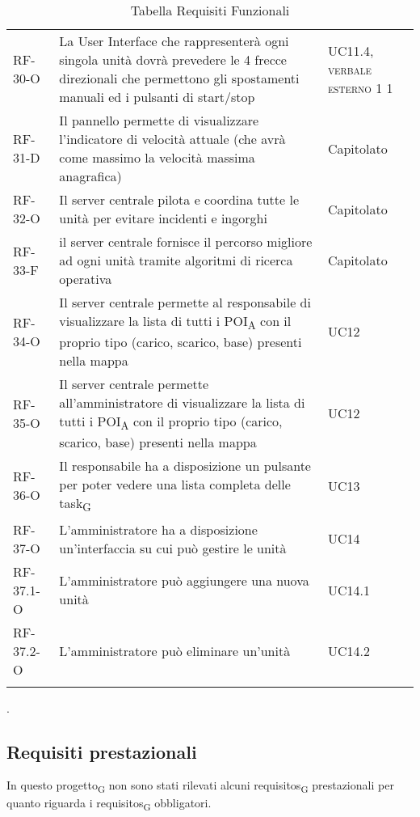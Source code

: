 \begin{longtable}{ 
		>{}p{} 
		>{}p{}
		>{\centering}p{} }
RF-30-O		&	La User Interface che rappresenterà ogni singola unità dovrà prevedere le 4 frecce direzionali che permettono gli spostamenti manuali ed i pulsanti di start/stop	&	UC11.4, \textsc{\textsc{verbale esterno 1} 1}\tabularnewline
RF-31-D		&	Il pannello permette di visualizzare l'indicatore di velocità attuale (che avrà come massimo la velocità massima anagrafica)	&	Capitolato\tabularnewline				
RF-32-O		&	Il server centrale pilota e coordina tutte le unità per evitare incidenti e ingorghi	&	Capitolato\tabularnewline
RF-33-F		&	il server centrale fornisce il percorso migliore ad ogni unità tramite algoritmi di ricerca operativa	&	Capitolato\tabularnewline				
RF-34-O		&	Il server centrale permette al responsabile di visualizzare la lista di tutti i \acrshort{POI}\textsubscript{A} con il proprio tipo (carico, scarico, base) presenti nella mappa	&	UC12\tabularnewline
RF-35-O		&	Il server centrale permette all'amministratore di visualizzare la lista di tutti i \acrshort{POI}\textsubscript{A} con il proprio tipo (carico, scarico, base) presenti nella mappa	&	UC12\tabularnewline				
RF-36-O		&	Il responsabile ha a disposizione un pulsante per poter vedere una lista completa delle \gls{task}\textsubscript{G}	&	UC13\tabularnewline			
RF-37-O		&	L'amministratore ha a disposizione un'interfaccia su cui può gestire le unità	&	UC14\tabularnewline
RF-37.1-O		&	L'amministratore può aggiungere una nuova unità	&	UC14.1\tabularnewline
RF-37.2-O		&	L'amministratore può eliminare un'unità	&	UC14.2\tabularnewline
\caption{Tabella Requisiti Funzionali\label{ Tabella Requisiti Funzionali}}
\end{longtable}.
\subsection{Requisiti prestazionali}
In questo \gls{progetto}\textsubscript{G} non sono stati rilevati alcuni \glspl{requisito}\textsubscript{G} prestazionali per quanto riguarda i \glspl{requisito}\textsubscript{G} obbligatori.
